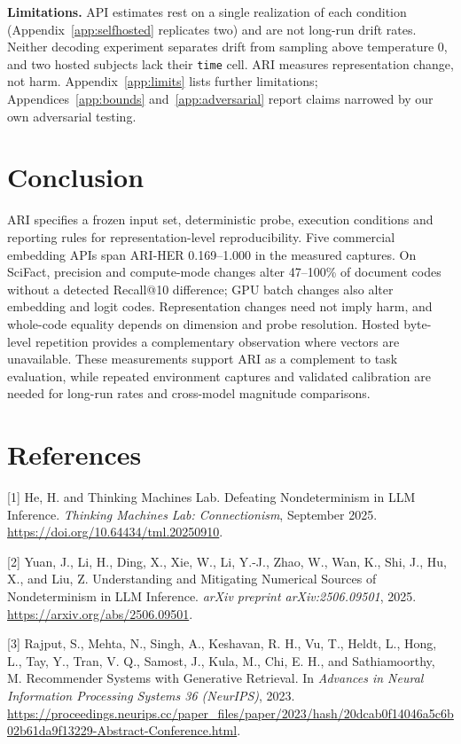 \documentclass{article}
\begin{document}
\textbf{Limitations.} API estimates rest on a single realization of each condition (Appendix~\ref{app:selfhosted} replicates two) and are not long-run drift rates. Neither decoding experiment separates drift from sampling above temperature 0, and two hosted subjects lack their \texttt{time} cell. ARI measures representation change, not harm. Appendix~\ref{app:limits} lists further limitations; Appendices~\ref{app:bounds} and~\ref{app:adversarial} report claims narrowed by our own adversarial testing.

\vspace{-5pt}\section{Conclusion}\label{sec5}\vspace{-2pt}

ARI specifies a frozen input set, deterministic probe, execution conditions and reporting rules for representation-level reproducibility. Five commercial embedding APIs span ARI-HER 0.169--1.000 in the measured captures. On SciFact, precision and compute-mode changes alter 47--100\% of document codes without a detected Recall@10 difference; GPU batch changes also alter embedding and logit codes. Representation changes need not imply harm, and whole-code equality depends on dimension and probe resolution. Hosted byte-level repetition provides a complementary observation where vectors are unavailable. These measurements support ARI as a complement to task evaluation, while repeated environment captures and validated calibration are needed for long-run rates and cross-model magnitude comparisons.\label{bodyend}


\section*{References}
\small

[1] He, H. and Thinking Machines Lab.
Defeating Nondeterminism in LLM Inference.
\emph{Thinking Machines Lab: Connectionism}, September 2025.
\url{https://doi.org/10.64434/tml.20250910}.

[2] Yuan, J., Li, H., Ding, X., Xie, W., Li, Y.-J., Zhao, W.,
Wan, K., Shi, J., Hu, X., and Liu, Z.
Understanding and Mitigating Numerical Sources of Nondeterminism
in LLM Inference.
\emph{arXiv preprint arXiv:2506.09501}, 2025.
\url{https://arxiv.org/abs/2506.09501}.

[3] Rajput, S., Mehta, N., Singh, A., Keshavan, R. H., Vu, T.,
Heldt, L., Hong, L., Tay, Y., Tran, V. Q., Samost, J., Kula, M.,
Chi, E. H., and Sathiamoorthy, M.
Recommender Systems with Generative Retrieval.
In \emph{Advances in Neural Information Processing Systems 36
(NeurIPS)}, 2023.
\url{https://proceedings.neurips.cc/paper_files/paper/2023/hash/20dcab0f14046a5c6b02b61da9f13229-Abstract-Conference.html}.
\end{document}
